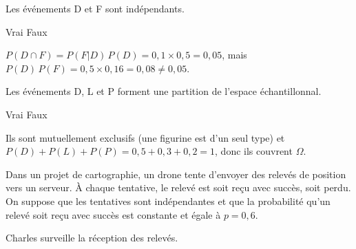 \begin{questions}
\begin{parts}
\begin{subparts}
        \subpart[1] Les événements D et F sont indépendants.
        
        \begin{oneparcheckboxes}
            \choice Vrai
            \correctchoice Faux
        \end{oneparcheckboxes}
        \begin{solution}
        $P(D\cap F)=P(F|D)\,P(D)=0{,}1\times 0{,}5=0{,}05$, mais $P(D)\,P(F)=0{,}5\times 0{,}16=0{,}08\neq 0{,}05$.
        \end{solution}

        \subpart[1] Les événements D, L et P forment une partition de l'espace échantillonnal.
        
        \begin{oneparcheckboxes}
            \correctchoice Vrai
            \choice Faux
        \end{oneparcheckboxes}
        \begin{solution}
        Ils sont mutuellement exclusifs (une figurine est d'un seul type) et $P(D)+P(L)+P(P)=0{,}5+0{,}3+0{,}2=1$, donc ils couvrent $\Omega$.
        \end{solution}
    \end{subparts}
    \vspace{0.5cm}
\end{parts}

\newpage




\question[]

Dans un projet de cartographie, un drone tente d’envoyer des relevés de
position vers un serveur. À chaque tentative, le relevé est soit reçu
avec succès, soit perdu. On suppose que les tentatives sont indépendantes
et que la probabilité qu’un relevé soit reçu avec succès est constante et
égale à $p=0{,}6$.

Charles surveille la réception des relevés.

\end{questions}
